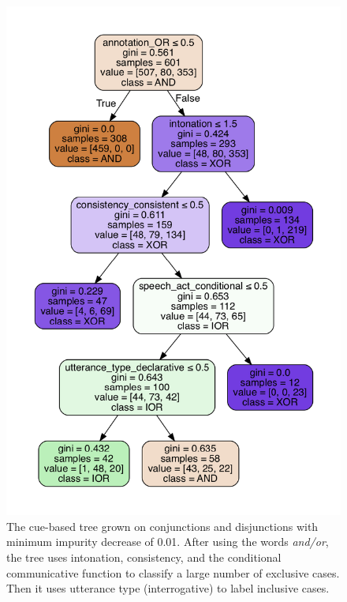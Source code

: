 \documentclass[,man,floatsintext]{apa6}
\begin{document}
\begin{figure}
\centering
\includegraphics{figs/ternaryCueBased-1.pdf}
\caption{\label{fig:ternaryCueBased}The cue-based tree grown on conjunctions and disjunctions with minimum impurity decrease of 0.01. After using the words \textit{and/or}, the tree uses intonation, consistency, and the conditional communicative function to classify a large number of exclusive cases. Then it uses utterance type (interrogative) to label inclusive cases.}
\end{figure}
\end{document}

